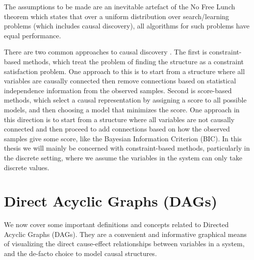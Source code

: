\documentclass{tufte-book}
\begin{document}
The assumptions to be made are an inevitable artefact of the No Free Lunch theorem \cite{wolpert-2020-what-no} which states that over a uniform distribution over search/learning problems (which includes causal discovery), all algorithms for such problems have equal performance.

There are two common approaches to causal discovery \cite{glymour-2019-review-causal}. The first is constraint-based methods, which treat the problem of finding the structure as a constraint satisfaction problem. One approach to this is to start from a structure where all variables are causally connected then remove connections based on statistical independence information from the observed samples. Second is score-based methods, which select a causal representation by assigning a score to all possible models, and then choosing a model that minimizes the score. One approach in this direction is to start from a structure where all variables are not causally connected and then proceed to add connections based on how the observed samples give some score, like the Bayesian Information Criterion (BIC). In this thesis we will mainly be concerned with constraint-based methods, particularly in the discrete setting, where we assume the variables in the system can only take discrete values.  



\section{Direct Acyclic Graphs (DAGs)}
\label{sec:org27e24d5}
We now cover some important definitions and concepts related to Directed Acyclic Graphs (DAGs). They are a convenient and informative graphical means of visualizing the direct cause-effect relationships between variables in a system, and the de-facto choice to model causal structures.
\end{document}
